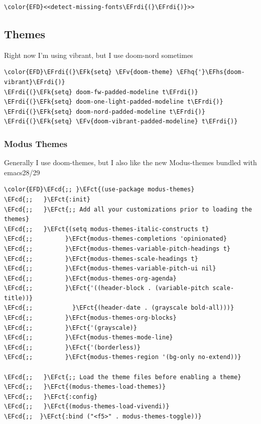 \documentclass{scrartcl}
\newcommand{\EFk}[1]{\textcolor{EFk}{#1}} %
\newcommand{\EFct}[1]{\textcolor{EFct}{#1}} %
\newcommand{\EFv}[1]{\textcolor{EFv}{#1}} %
\newcommand{\EFcd}[1]{\textcolor{EFcd}{#1}} %
\newcommand{\EFhq}[1]{#1} %
\newcommand{\EFhs}[1]{#1} %
\newcommand{\EFrdi}[1]{#1} %
\begin{document}
\begin{Code}
\begin{Verbatim}[]
\color{EFD}<<detect-missing-fonts\EFrdi{(}\EFrdi{)}>>
\end{Verbatim}
\end{Code}

\subsection{Themes}
\label{sec:org37f9477}
Right now I'm using vibrant, but I use doom-nord sometimes
\begin{Code}
\begin{Verbatim}[]
\color{EFD}\EFrdi{(}\EFk{setq} \EFv{doom-theme} \EFhq{'}\EFhs{doom-vibrant}\EFrdi{)}
\EFrdi{(}\EFk{setq} doom-fw-padded-modeline t\EFrdi{)}
\EFrdi{(}\EFk{setq} doom-one-light-padded-modeline t\EFrdi{)}
\EFrdi{(}\EFk{setq} doom-nord-padded-modeline t\EFrdi{)}
\EFrdi{(}\EFk{setq} \EFv{doom-vibrant-padded-modeline} t\EFrdi{)}
\end{Verbatim}
\end{Code}

\subsubsection{Modus Themes}
\label{sec:orgb4efc8a}
Generally I use doom-themes, but I also like the new Modus-themes bundled with emacs28/29
\begin{Code}
\begin{Verbatim}[]
\color{EFD}\EFcd{;; }\EFct{(use-package modus-themes}
\EFcd{;;   }\EFct{:init}
\EFcd{;;   }\EFct{;; Add all your customizations prior to loading the themes}
\EFcd{;;   }\EFct{(setq modus-themes-italic-constructs t}
\EFcd{;;         }\EFct{modus-themes-completions 'opinionated}
\EFcd{;;         }\EFct{modus-themes-variable-pitch-headings t}
\EFcd{;;         }\EFct{modus-themes-scale-headings t}
\EFcd{;;         }\EFct{modus-themes-variable-pitch-ui nil}
\EFcd{;;         }\EFct{modus-themes-org-agenda}
\EFcd{;;         }\EFct{'((header-block . (variable-pitch scale-title))}
\EFcd{;;           }\EFct{(header-date . (grayscale bold-all)))}
\EFcd{;;         }\EFct{modus-themes-org-blocks}
\EFcd{;;         }\EFct{'(grayscale)}
\EFcd{;;         }\EFct{modus-themes-mode-line}
\EFcd{;;         }\EFct{'(borderless)}
\EFcd{;;         }\EFct{modus-themes-region '(bg-only no-extend))}

\EFcd{;;   }\EFct{;; Load the theme files before enabling a theme}
\EFcd{;;   }\EFct{(modus-themes-load-themes)}
\EFcd{;;   }\EFct{:config}
\EFcd{;;   }\EFct{(modus-themes-load-vivendi)}
\EFcd{;;  }\EFct{:bind ("<f5>" . modus-themes-toggle))}
\end{Verbatim}
\end{Code}
\end{document}
